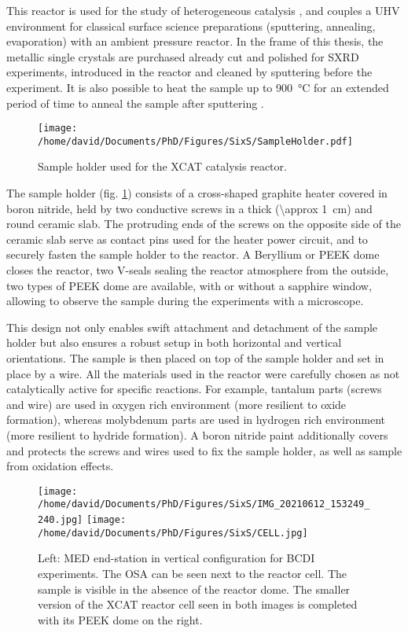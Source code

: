This reactor is used for the study of heterogeneous catalysis \parencite{VanRijn2010, Resta2020a}, and couples a UHV environment for classical surface science preparations (sputtering, annealing, evaporation) with an ambient pressure reactor.
In the frame of this thesis, the metallic single crystals are purchased already cut and polished for SXRD experiments, introduced in the reactor and cleaned by sputtering \parencite{Taglauer1990} before the experiment.
It is also possible to heat the sample up to \qty{900}{\degreeCelsius} for an extended period of time to anneal the sample after sputtering \parencite{Musket1982}.

\begin{figure}[!htb]
    \centering
    \texttt{[image: /home/david/Documents/PhD/Figures/SixS/SampleHolder.pdf]}
    \caption{
        Sample holder used for the XCAT catalysis reactor.
    }
    \label{fig:SampleHolder}
\end{figure}

The sample holder (fig. \ref{fig:SampleHolder}) consists of a cross-shaped graphite heater covered in boron nitride, held by two conductive screws in a thick (\qty{\approx 1}{\cm}) and round ceramic slab.
The protruding ends of the screws on the opposite side of the ceramic slab serve as contact pins used for the heater power circuit, and to securely fasten the sample holder to the reactor.
A Beryllium or PEEK dome closes the reactor, two V-seals sealing the reactor atmosphere from the outside, two types of PEEK dome are available, with or without a sapphire window, allowing to observe the sample during the experiments with a microscope.

This design not only enables swift attachment and detachment of the sample holder but also ensures a robust setup in both horizontal and vertical orientations.
The sample is then placed on top of the sample holder and set in place by a wire.
All the materials used in the reactor were carefully chosen as not catalytically active for specific reactions.
For example, tantalum parts (screws and wire) are used in oxygen rich environment (more resilient to oxide formation), whereas molybdenum parts are used in hydrogen rich environment (more resilient to hydride formation).
A boron nitride paint additionally covers and protects the screws and wires used to fix the sample holder, as well as sample from oxidation effects.

\begin{figure}[!htb]
    \centering
    \texttt{[image: /home/david/Documents/PhD/Figures/SixS/IMG\_20210612\_153249\_240.jpg]}
    \texttt{[image: /home/david/Documents/PhD/Figures/SixS/CELL.jpg]}
    \caption{
        Left: MED end-station in vertical configuration for BCDI experiments.
        The OSA can be seen next to the reactor cell.
        The sample is visible in the absence of the reactor dome.
        The smaller version of the XCAT reactor cell seen in both images is completed with its PEEK dome on the right.
    }
    \label{fig:MEDV}
\end{figure}

